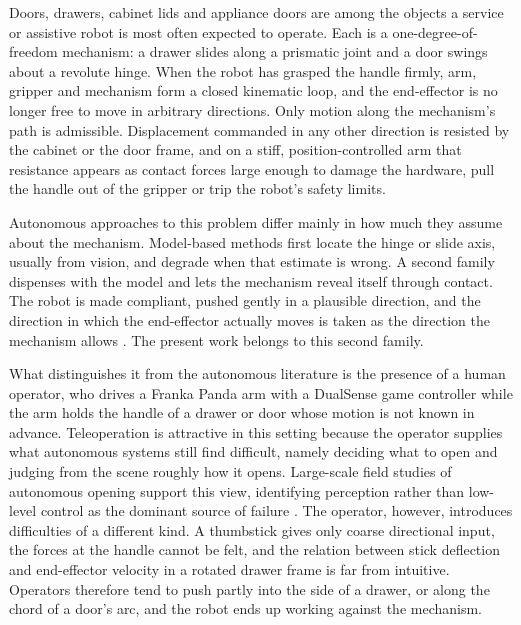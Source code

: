 \documentclass[11pt,letterpaper]{article}
\begin{document}
Doors, drawers, cabinet lids and appliance doors are among the objects a service or assistive robot is most often expected to operate. Each is a one-degree-of-freedom mechanism: a drawer slides along a prismatic joint and a door swings about a revolute hinge. When the robot has grasped the handle firmly, arm, gripper and mechanism form a closed kinematic loop, and the end-effector is no longer free to move in arbitrary directions. Only motion along the mechanism's path is admissible. Displacement commanded in any other direction is resisted by the cabinet or the door frame, and on a stiff, position-controlled arm that resistance appears as contact forces large enough to damage the hardware, pull the handle out of the gripper or trip the robot's safety limits.

Autonomous approaches to this problem differ mainly in how much they assume about the mechanism. Model-based methods first locate the hinge or slide axis, usually from vision, and degrade when that estimate is wrong. A second family dispenses with the model and lets the mechanism reveal itself through contact. The robot is made compliant, pushed gently in a plausible direction, and the direction in which the end-effector actually moves is taken as the direction the mechanism allows \cite{niemeyer1997simple,lutscher2010control,karayiannidis2013modelfree}. The present work belongs to this second family.

What distinguishes it from the autonomous literature is the presence of a human operator, who drives a Franka Panda arm with a DualSense game controller while the arm holds the handle of a drawer or door whose motion is not known in advance. Teleoperation is attractive in this setting because the operator supplies what autonomous systems still find difficult, namely deciding what to open and judging from the scene roughly how it opens. Large-scale field studies of autonomous opening support this view, identifying perception rather than low-level control as the dominant source of failure \cite{gupta2025opening}. The operator, however, introduces difficulties of a different kind. A thumbstick gives only coarse directional input, the forces at the handle cannot be felt, and the relation between stick deflection and end-effector velocity in a rotated drawer frame is far from intuitive. Operators therefore tend to push partly into the side of a drawer, or along the chord of a door's arc, and the robot ends up working against the mechanism.
\end{document}
